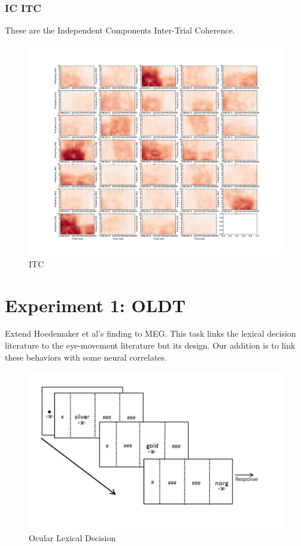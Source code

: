 \documentclass[english]{article}
\begin{document}
\subsubsection{IC ITC}
These are the Independent Components Inter-Trial Coherence.
\begin{figure}[H]
\begin{centering}
\includegraphics[scale=0.25]{ica-tf}
\par\end{centering}
\caption{\label{fig:ica-itc} ITC}
\end{figure}

\section{Experiment 1: OLDT}

Extend Hoedemaker et al's finding to MEG. This task links the lexical decision
literature to the eye-movement literature but its design.
Our addition is to link these behaviors with some neural correlates.

\begin{figure}[H]
\begin{centering}
\includegraphics[scale=0.33]{oldt}
\par\end{centering}
\caption{\label{fig:oldt} Ocular Lexical Decision}
\end{figure}
\end{document}
